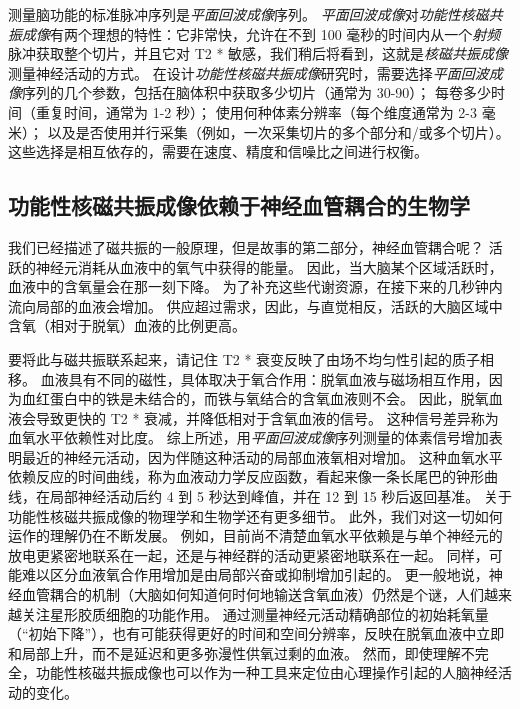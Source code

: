 测量脑功能的标准脉冲序列是\textit{平面回波成像}序列。 
\textit{平面回波成像}对\textit{功能性核磁共振成像}有两个理想的特性：它非常快，允许在不到 100 毫秒的时间内从一个\textit{射频}脉冲获取整个切片，并且它对 T2 * 敏感，我们稍后将看到，这就是\textit{核磁共振成像}测量神经活动的方式。
在设计\textit{功能性核磁共振成像}研究时，需要选择\textit{平面回波成像}序列的几个参数，包括在脑体积中获取多少切片（通常为 30-90）；
每卷多少时间（重复时间，通常为 1-2 秒）； 使用何种体素分辨率（每个维度通常为 2-3 毫米）； 
以及是否使用并行采集（例如，一次采集切片的多个部分和/或多个切片）。
这些选择是相互依存的，需要在速度、精度和信噪比之间进行权衡。



\subsection{功能性核磁共振成像依赖于神经血管耦合的生物学}

我们已经描述了磁共振的一般原理，但是故事的第二部分，神经血管耦合呢？
活跃的神经元消耗从血液中的氧气中获得的能量。 
因此，当大脑某个区域活跃时，血液中的含氧量会在那一刻下降。
为了补充这些代谢资源，在接下来的几秒钟内流向局部的血液会增加。
供应超过需求，因此，与直觉相反，活跃的大脑区域中含氧（相对于脱氧）血液的比例更高。


要将此与磁共振联系起来，请记住 T2 * 衰变反映了由场不均匀性引起的质子相移。 
血液具有不同的磁性，具体取决于氧合作用：脱氧血液与磁场相互作用，因为血红蛋白中的铁是未结合的，而铁与氧结合的含氧血液则不会。
因此，脱氧血液会导致更快的 T2 * 衰减，并降低相对于含氧血液的信号。
这种信号差异称为血氧水平依赖性对比度。 
综上所述，用\textit{平面回波成像}序列测量的体素信号增加表明最近的神经元活动，因为伴随这种活动的局部血液氧相对增加。
这种血氧水平依赖反应的时间曲线，称为血液动力学反应函数，看起来像一条长尾巴的钟形曲线，在局部神经活动后约 4 到 5 秒达到峰值，并在 12 到 15 秒后返回基准。
关于功能性核磁共振成像的物理学和生物学还有更多细节。 
此外，我们对这一切如何运作的理解仍在不断发展。 
例如，目前尚不清楚血氧水平依赖是与单个神经元的放电更紧密地联系在一起，还是与神经群的活动更紧密地联系在一起。
同样，可能难以区分血液氧合作用增加是由局部兴奋或抑制增加引起的。 
更一般地说，神经血管耦合的机制（大脑如何知道何时何地输送含氧血液）仍然是个谜，人们越来越关注星形胶质细胞的功能作用。 
通过测量神经元活动精确部位的初始耗氧量（“初始下降”），也有可能获得更好的时间和空间分辨率，反映在脱氧血液中立即和局部上升，而不是延迟和更多弥漫性供氧过剩的血液。 
然而，即使理解不完全，功能性核磁共振成像也可以作为一种工具来定位由心理操作引起的人脑神经活动的变化。



